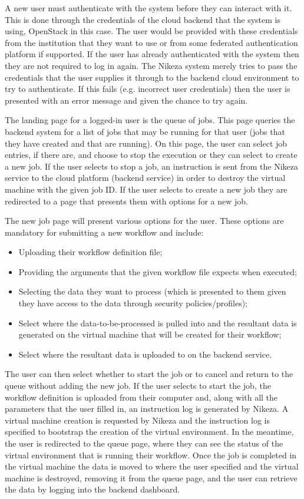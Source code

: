  A new user must authenticate with the system before they can interact with it. This is done through the credentials of the cloud backend that the system is using, OpenStack in this case. The user would be provided with these credentials from the institution that they want to use or from some federated authentication platform if supported. If the user has already authenticated with the system then they are not required to log in again. The Nikeza system merely tries to pass the credentials that the user supplies it through to the backend cloud environment to try to authenticate. If this fails (e.g. incorrect user credentials) then the user is presented with an error message and given the chance to try again.

The landing page for a logged-in user is the queue of jobs. This page queries the backend system for a list of jobs that may be running for that user (jobs that they have created and that are running). On this page, the user can select job entries, if there are, and choose to stop the execution or they can select to create a new job. If the user selects to stop a job, an instruction is sent from the Nikeza service to the cloud platform (backend service) in order to destroy the virtual machine with the given job ID. If the user selects to create a new job they are redirected to a page that presents them with options for a new job.

The new job page will present various options for the user. These options are mandatory for submitting a new workflow and include:
\begin{itemize}
    \item Uploading their workflow definition file;
    \item Providing the arguments that the given workflow file expects when executed;
    \item Selecting the data they want to process (which is presented to them given they have access to the data through security policies/profiles);
    \item Select where the data-to-be-processed is pulled into and the resultant data is generated on the virtual machine that will be created for their workflow;
    \item Select where the resultant data is uploaded to on the backend service. 
\end{itemize}

The user can then select whether to start the job or to cancel and return to the queue without adding the new job. If the user selects to start the job, the workflow definition is uploaded from their computer and, along with all the parameters that the user filled in, an instruction log is generated by Nikeza. A virtual machine creation is requested by Nikeza and the instruction log is specified to bootstrap the creation of the virtual environment. In the meantime, the user is redirected to the queue page, where they can see the status of the virtual environment that is running their workflow. Once the job is completed in the virtual machine the data is moved to where the user specified and the virtual machine is destroyed, removing it from the queue page, and the user can retrieve the data by logging into the backend dashboard.


